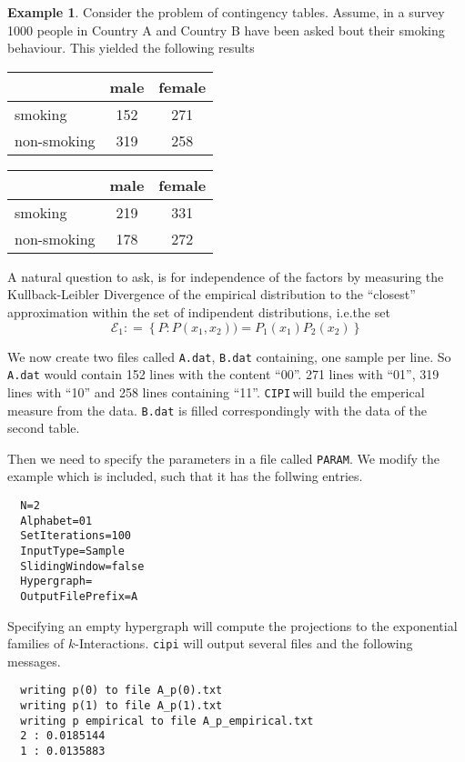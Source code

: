 \documentclass[12pt]{amsart}
\newcommand{\set}[1]{\left\lbrace #1 \right\rbrace} %
\newcommand{\defas}{\mathrel{\mathop{:}}=}   %
\newcommand{\ie}{i.e.\;}  %
\newcommand{\cipi}{\texttt{CIPI}\,}
\theoremstyle{plain}%
\theoremstyle{definition}
\newtheorem{exmp}[thm]{Example}
\theoremstyle{remark}
\begin{document}
\begin{exmp}
  Consider the problem of contingency tables. Assume, in a survey 1000 people in
  Country A and Country B have been asked bout their smoking behaviour. This
  yielded the following results
  \begin{center}
  \begin{tabular}[]{|l|c|c|}
    \hline
    & male & female \\
    \hline
    smoking & 152 & 271 \\
    non-smoking & 319 & 258\\
    \hline
  \end{tabular}\hspace{1cm}
  \begin{tabular}[]{|l|c|c|}
    \hline
    & male & female \\
    \hline
    smoking & 219 & 331 \\
    non-smoking & 178 & 272\\
    \hline
  \end{tabular}
\end{center}

  A natural question to ask, is for independence of the factors by
  measuring the Kullback-Leibler Divergence of the empirical distribution to the
  ``closest'' approximation within the set of indipendent distributions, \ie the
  set 
  \begin{equation*}
    \mathcal{E}_1 \defas \set{P : P\left( x_1,x_2 \right)) = P_1(x_1)P_2(x_2)}
  \end{equation*}

  We now create two files called \texttt{A.dat}, \texttt{B.dat} 
  containing, one sample per line. So \texttt{A.dat} would contain 152 lines
  with the content ``00''. 271 lines with ``01'', 319 lines with ``10'' and 258
  lines containing ``11''. \cipi will build the emperical measure from the data.
  \texttt{B.dat} is filled correspondingly with the data of the second table. 

  Then we need to specify the parameters in a file called \texttt{PARAM}. We
  modify the example which is included, such that it has the follwing entries.
  \begin{verbatim}
  N=2
  Alphabet=01
  SetIterations=100
  InputType=Sample
  SlidingWindow=false
  Hypergraph=
  OutputFilePrefix=A
  \end{verbatim}
  Specifying an empty hypergraph will compute the projections to the exponential
  families of $k$-Interactions. \texttt{cipi} will output several files and the
  following messages.
  \begin{verbatim}
  writing p(0) to file A_p(0).txt
  writing p(1) to file A_p(1).txt
  writing p empirical to file A_p_empirical.txt
  2 : 0.0185144
  1 : 0.0135883


\end{verbatim}
\end{exmp}
\end{document}
